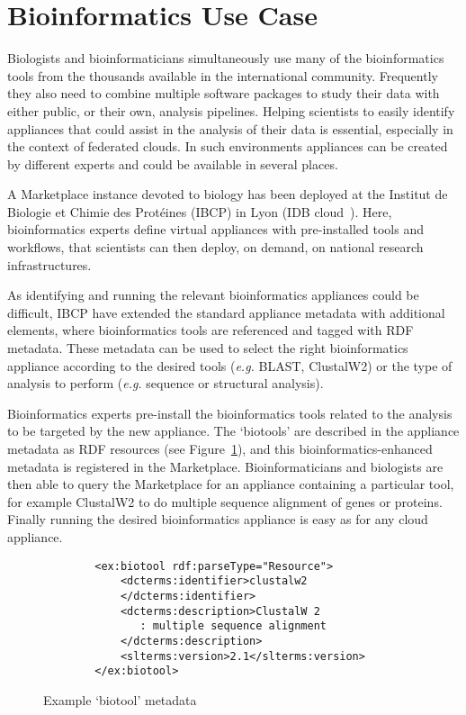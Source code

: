 \section{Bioinformatics Use Case}
\label{sec:bioinfo}

Biologists and bioinformaticians simultaneously use many of the bioinformatics tools from the thousands available in the international community. Frequently they also need to combine multiple software packages to study their data with either public, or their own, analysis pipelines. Helping scientists to easily identify appliances that could assist in the analysis of their data is essential, especially in the context of federated clouds. In such environments appliances can be created by different experts and could be available in several places.

A Marketplace instance devoted to biology has been deployed at the Institut de Biologie et Chimie des Prot\'eines (IBCP) in Lyon (IDB cloud~\cite{idbcloud}). Here, bioinformatics experts define virtual appliances with pre-installed tools and workflows, that scientists can then deploy, on demand, on national research infrastructures.

As identifying and running the relevant bioinformatics appliances could be difficult, IBCP have extended the standard appliance metadata with additional elements, where bioinformatics tools are referenced and tagged with RDF metadata. These metadata can be used to select the right bioinformatics appliance according to the desired tools (\textit{e.g.} BLAST, ClustalW2) or the type of analysis to perform (\textit{e.g.} sequence or structural analysis).

Bioinformatics experts pre-install the bioinformatics tools related to the analysis to be targeted by the new appliance. The `biotools' are described in the appliance metadata as RDF resources (see Figure~\ref{fig:biotool-schema}), and this bioinformatics-enhanced metadata is registered in the Marketplace. Bioinformaticians and biologists are then able to query the Marketplace for an appliance containing a particular tool, for example ClustalW2 to do multiple sequence alignment of genes or proteins. Finally running the desired bioinformatics appliance is easy as for any cloud appliance.

\begin{figure}
 \begin{center}
    \small
    \begin{lstlisting}
        <ex:biotool rdf:parseType="Resource">
            <dcterms:identifier>clustalw2
            </dcterms:identifier>
            <dcterms:description>ClustalW 2
               : multiple sequence alignment
            </dcterms:description>
            <slterms:version>2.1</slterms:version>
        </ex:biotool>
    \end{lstlisting}
     \caption{Example `biotool' metadata}
    \label{fig:biotool-schema}
  \end{center}
\end{figure}
